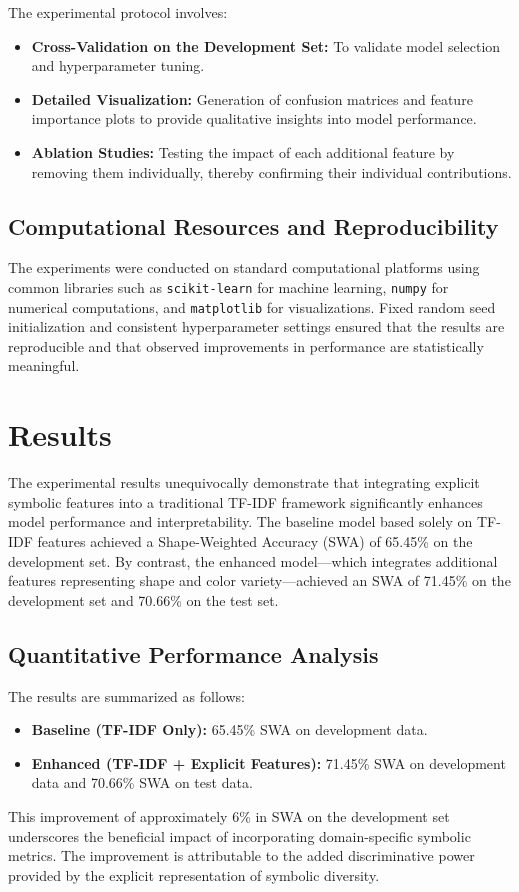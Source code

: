 \documentclass{article}
\begin{document}
The experimental protocol involves:
\begin{itemize}
    \item \textbf{Cross-Validation on the Development Set:} To validate model selection and hyperparameter tuning.
    \item \textbf{Detailed Visualization:} Generation of confusion matrices and feature importance plots to provide qualitative insights into model performance.
    \item \textbf{Ablation Studies:} Testing the impact of each additional feature by removing them individually, thereby confirming their individual contributions.
\end{itemize}

\subsection{Computational Resources and Reproducibility}
The experiments were conducted on standard computational platforms using common libraries such as \texttt{scikit-learn} for machine learning, \texttt{numpy} for numerical computations, and \texttt{matplotlib} for visualizations. Fixed random seed initialization and consistent hyperparameter settings ensured that the results are reproducible and that observed improvements in performance are statistically meaningful.

\section{Results}
The experimental results unequivocally demonstrate that integrating explicit symbolic features into a traditional TF-IDF framework significantly enhances model performance and interpretability. The baseline model based solely on TF-IDF features achieved a Shape-Weighted Accuracy (SWA) of 65.45\% on the development set. By contrast, the enhanced model—which integrates additional features representing shape and color variety—achieved an SWA of 71.45\% on the development set and 70.66\% on the test set.

\subsection{Quantitative Performance Analysis}
The results are summarized as follows:
\begin{itemize}
    \item \textbf{Baseline (TF-IDF Only):} 65.45\% SWA on development data.
    \item \textbf{Enhanced (TF-IDF + Explicit Features):} 71.45\% SWA on development data and 70.66\% SWA on test data.
\end{itemize}
This improvement of approximately 6\% in SWA on the development set underscores the beneficial impact of incorporating domain-specific symbolic metrics. The improvement is attributable to the added discriminative power provided by the explicit representation of symbolic diversity.
\end{document}
